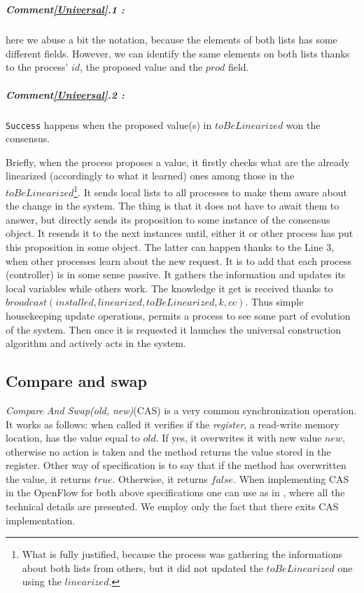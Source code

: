 \documentclass{article}
\theoremstyle{remark}
\begin{document}
\\
\subparagraph{Comment\ref{Universal}.1 :} here we abuse a bit the notation, because the elements of both lists has some different fields. However, we can identify the same elements on both lists thanks to the process' $id$, the proposed value and the $prod$ field.
\subparagraph{Comment\ref{Universal}.2 :} \texttt{Success} happens when the proposed value(s) in $toBeLinearized$ won the consensus.

Briefly, when the process proposes a value, it firstly checks what are the already linearized (accordingly to what it learned) ones among those in the $toBeLinearized$\footnote{What is fully justified, because the process was gathering the informations about both lists from others, but it did not updated the $toBeLinearized$ one using the $linearized$.}. It sends local lists to all processes to make them aware about the change in the system. The thing is that it does not have to await them to answer, but directly sends its proposition to some instance of the consensus object. It resends it to the next instances until, either it or other process has put this proposition in some object. The latter can happen thanks to the Line 3, when other processes learn about the new request.
It is to add that each process (controller) is in some sense passive. It gathers the information and updates its local variables while others work. The knowledge it get is received thanks to $broadcast(installed,linearized,toBeLinearized,k,cc)$. Thus simple housekeeping update operations, permits a process to see some part of evolution of the system. Then once it is requested it launches the universal construction algorithm and actively acts in the system.
\subsection{Compare and swap}
\emph{Compare And Swap(old, new)}(CAS) is a very common synchronization operation. It works as follows: when called it verifies if the \emph{register}, a read-write memory location, has the value equal to $old$. If yes, it overwrites it with new value $new$, otherwise no action is taken and the method returns the value stored in the register. Other way of specification is to say that if the method has overwritten the value, it returns $true$. Otherwise, it returns $false$.
When implementing CAS in the OpenFlow for both above specifications one can use as in \cite{In-band}, where all the technical details are presented. We employ only the fact that there exits CAS implementation.
\end{document}
